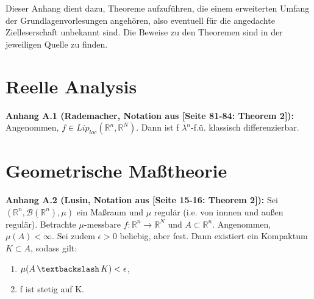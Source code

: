 \documentclass[
	language=german, %
	type=master, %
]{isthesis}
\begin{document}
     \begin{appendix}
      Dieser Anhang dient dazu, Theoreme aufzuführen, die einem erweiterten Umfang der Grundlagenvorlesungen angehören, also eventuell für die angedachte Zielleserschaft unbekannt sind. Die Beweise zu den Theoremen sind in der jeweiligen Quelle zu finden.\\
      \section{Reelle Analysis}
\colorbox{generalYellow}{\begin{minipage}{16cm}{\textcolor{black}{}{\label{theoA.1}}}
\textbf{Anhang A.1 (Rademacher, Notation aus \cite{EvansMeaTh}[Seite 81-84: Theorem 2]):} Angenommen, \(f \in Lip_{loc}(\mathbb{R}^n,\mathbb{R}^N)\). Dann ist f \(\lambda^n\)-f.ü. klassisch differenzierbar.
\end{minipage}}
      \section{Geometrische Maßtheorie}
\colorbox{generalYellow}{\begin{minipage}{16cm}{\textcolor{black}{}{\label{theoA.2}}}
\textbf{Anhang A.2 (Lusin, Notation aus \cite{EvansMeaTh}[Seite 15-16: Theorem 2]):} Sei \((\mathbb{R}^n, \mathcal{B}(\mathbb{R}^n),\mu)\) ein Maßraum und \(\mu\) regulär (i.e. von innnen und außen regulär). Betrachte \(\mu \text{-messbare } f:\mathbb{R}^n \to \mathbb{R}^N\) und \(A \subset \mathbb{R}^n\). Angenommen, \(\mu(A) < \infty\). Sei zudem \(\epsilon > 0\) beliebig, aber fest. Dann existiert ein Kompaktum \(K \subset A\), sodass gilt:
\begin{enumerate}
    \item \(\mu(A \, \textbackslash \, K) < \epsilon\),
    \item f ist stetig auf K.
\end{enumerate}
\end{minipage}}


\end{appendix}
\end{document}

